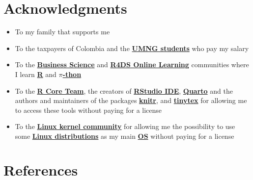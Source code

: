 \documentclass[
  ignorenonframetext,
]{beamer}
\begin{document}
\section{Acknowledgments}\label{acknowledgments}

\begin{frame}{}
\label{section-17}
\begin{itemize}
\item
  To my family that supports me
\item
  To the taxpayers of Colombia and the
  \href{https://www.umng.edu.co/estudiante}{\textbf{UMNG students}} who
  pay my salary
\item
  To the \href{https://www.business-science.io/}{\textbf{Business
  Science}} and \href{https://www.rfordatasci.com/}{\textbf{R4DS Online
  Learning}} communities where I learn
  \href{https://www.r-project.org/about.html}{\textbf{R}} and
  \href{https://www.python.org/about/}{\textbf{\(\pi\)-thon}}
\item
  To the \href{https://www.r-project.org/contributors.html}{\textbf{R
  Core Team}}, the creators of
  \href{https://rstudio.com/products/rstudio/}{\textbf{RStudio IDE}},
  \href{https://quarto.org/}{\textbf{Quarto}} and the authors and
  maintainers of the packages
  \href{https://CRAN.R-project.org/package=knitr}{\textbf{knitr}}, and
  \href{https://CRAN.R-project.org/package=tinytex}{\textbf{tinytex}}
  for allowing me to access these tools without paying for a license
\item
  To the \href{https://www.kernel.org/category/about.html}{\textbf{Linux
  kernel community}} for allowing me the possibility to use some
  \href{https://static.lwn.net/Distributions/}{\textbf{Linux
  distributions}} as my main
  \href{https://en.wikipedia.org/wiki/Operating_system}{\textbf{OS}}
  without paying for a license
\end{itemize}
\end{frame}

\section*{References}\label{references}
\end{document}
